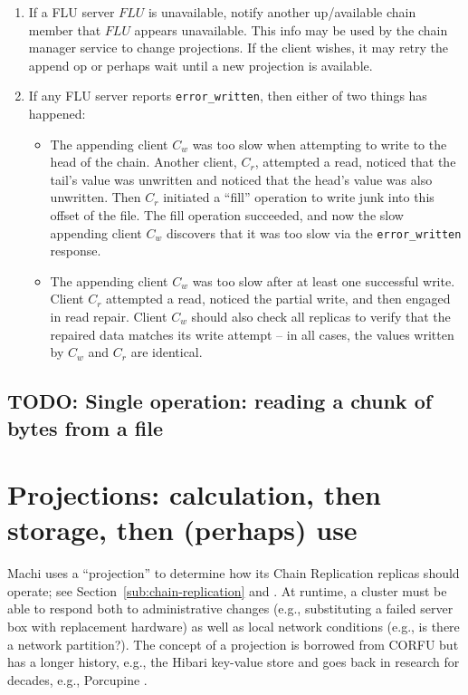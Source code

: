 \documentclass[preprint,10pt]{sigplanconf}
\begin{document}
\begin{enumerate}
\item If a FLU server $FLU$ is unavailable, notify another up/available
chain member that $FLU$ appears unavailable.  This info may be used by
the chain manager service to change projections.  If the client
wishes, it may retry the append op or perhaps wait until a new projection is
available.

\item If any FLU server reports {\tt error\_written}, then either of two
things has happened:
\begin{itemize}
    \item The appending client $C_w$ was too slow when attempting to write
    to the head of the chain.
    Another client, $C_r$, attempted a read, noticed that the tail's value was
    unwritten and noticed that the head's value was also unwritten.
    Then $C_r$ initiated a ``fill'' operation to write junk into
    this offset of
    the file.  The fill operation succeeded, and now the slow
    appending client $C_w$ discovers that it was too slow via the
    {\tt error\_written} response.
    \item The appending client $C_w$ was too slow after at least one
    successful write. 
    Client $C_r$ attempted a read, noticed the partial write, and
    then engaged in read repair.  Client $C_w$ should also check all
    replicas to verify that the repaired data matches its write
    attempt -- in all cases, the values written by $C_w$ and $C_r$ are
    identical.
\end{itemize}

\end{enumerate}

\subsection{TODO: Single operation: reading a chunk of bytes from a file}
\label{sec:sketch-read}

\section{Projections: calculation, then storage, then (perhaps) use}
\label{sec:projections}

Machi uses a ``projection'' to determine how its Chain Replication replicas
should operate; see Section~\ref{sub:chain-replication} and
\cite{corfu1}.  At runtime, a cluster must be able to respond both to
administrative changes (e.g., substituting a failed server box with
replacement hardware) as well as local network conditions (e.g., is
there a network partition?).  The concept of a projection is borrowed
from CORFU but has a longer history, e.g., the Hibari key-value store
\cite{cr-theory-and-practice} and goes back in research for decades,
e.g., Porcupine \cite{porcupine}.
\end{document}
